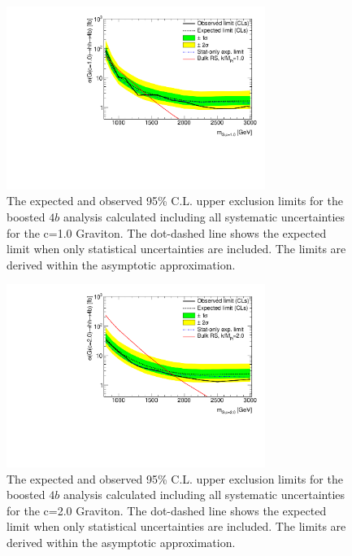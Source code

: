 \begin{figure}
\begin{center}
\includegraphics[width=0.75\textwidth,angle=-90]{figures/boosted/results/limit_boosted_boosted_okt18_g10.pdf}
\caption{The expected and observed 95\% C.L. upper exclusion limits for the boosted $4b$ analysis calculated including all systematic uncertainties for the c=1.0 Graviton. The dot-dashed line shows the expected limit when only statistical uncertainties are included. The limits are derived within the asymptotic approximation.}
\label{fig:limit_scalar}
\end{center}
\end{figure}
\begin{figure}

\begin{center}
\includegraphics[width=0.75\textwidth,angle=-90]{figures/boosted/results/limit_boosted_boosted_okt18_g20.pdf}
\caption{The expected and observed 95\% C.L. upper exclusion limits for the boosted $4b$ analysis calculated including all systematic uncertainties for the c=2.0 Graviton. The dot-dashed line shows the expected limit when only statistical uncertainties are included. The limits are derived within the asymptotic approximation.}
\label{fig:limit_scalar}
\end{center}
\end{figure}

